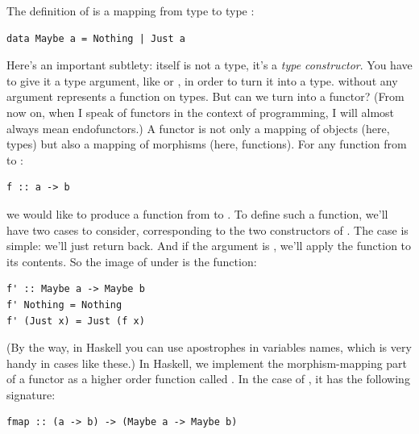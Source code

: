 The definition of  is a mapping from type  to
type :

\begin{Verbatim}[commandchars=\\\{\}]
data Maybe a = Nothing | Just a
\end{Verbatim}
Here's an important subtlety:  itself is not a type, it's
a \emph{type constructor}. You have to give it a type argument, like
 or , in order to turn it into a type.
 without any argument represents a function on types. But
can we turn  into a functor? (From now on, when I speak of
functors in the context of programming, I will almost always mean
endofunctors.) A functor is not only a mapping of objects (here, types)
but also a mapping of morphisms (here, functions). For any function from
 to :

\begin{Verbatim}[commandchars=\\\{\}]
f :: a -> b
\end{Verbatim}
we would like to produce a function from  to
. To define such a function, we'll have two cases to
consider, corresponding to the two constructors of . The
 case is simple: we'll just return 
back. And if the argument is , we'll apply the function
 to its contents. So the image of  under
 is the function:

\begin{Verbatim}[commandchars=\\\{\}]
f' :: Maybe a -> Maybe b
f' Nothing = Nothing
f' (Just x) = Just (f x)
\end{Verbatim}
(By the way, in Haskell you can use apostrophes in variables names,
which is very handy in cases like these.) In Haskell, we implement the
morphism-mapping part of a functor as a higher order function called
. In the case of , it has the following
signature:

\begin{Verbatim}[commandchars=\\\{\}]
fmap :: (a -> b) -> (Maybe a -> Maybe b)
\end{Verbatim}

\begin{figure}[H]
\centering
{}
\end{figure}

